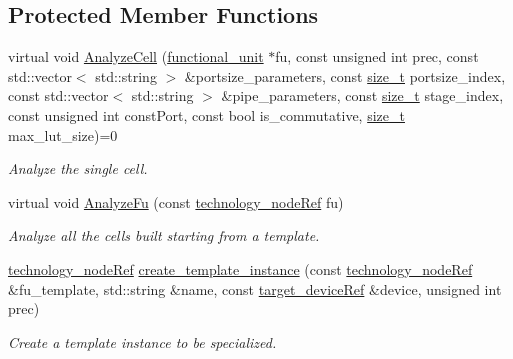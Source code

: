 \subsection*{Protected Member Functions}
\begin{DoxyCompactItemize}
\item 
virtual void \hyperlink{classFunctionalUnitStep_afe8188cf489c2c980bc537f5ed37a5cc}{Analyze\+Cell} (\hyperlink{structfunctional__unit}{functional\+\_\+unit} $\ast$fu, const unsigned int prec, const std\+::vector$<$ std\+::string $>$ \&portsize\+\_\+parameters, const \hyperlink{tutorial__fpt__2017_2intro_2sixth_2test_8c_a7c94ea6f8948649f8d181ae55911eeaf}{size\+\_\+t} portsize\+\_\+index, const std\+::vector$<$ std\+::string $>$ \&pipe\+\_\+parameters, const \hyperlink{tutorial__fpt__2017_2intro_2sixth_2test_8c_a7c94ea6f8948649f8d181ae55911eeaf}{size\+\_\+t} stage\+\_\+index, const unsigned int const\+Port, const bool is\+\_\+commutative, \hyperlink{tutorial__fpt__2017_2intro_2sixth_2test_8c_a7c94ea6f8948649f8d181ae55911eeaf}{size\+\_\+t} max\+\_\+lut\+\_\+size)=0
\begin{DoxyCompactList}\small\item\em Analyze the single cell. \end{DoxyCompactList}\item 
virtual void \hyperlink{classFunctionalUnitStep_a2456178e681c87f30485f3658589615f}{Analyze\+Fu} (const \hyperlink{technology__node_8hpp_a33dd193b7bd6b987bf0d8a770a819fa7}{technology\+\_\+node\+Ref} fu)
\begin{DoxyCompactList}\small\item\em Analyze all the cells built starting from a template. \end{DoxyCompactList}\item 
\hyperlink{technology__node_8hpp_a33dd193b7bd6b987bf0d8a770a819fa7}{technology\+\_\+node\+Ref} \hyperlink{classFunctionalUnitStep_a49ddb30d5388317d1ca7b69455aaeff0}{create\+\_\+template\+\_\+instance} (const \hyperlink{technology__node_8hpp_a33dd193b7bd6b987bf0d8a770a819fa7}{technology\+\_\+node\+Ref} \&fu\+\_\+template, std\+::string \&name, const \hyperlink{target__device_8hpp_acedb2b7a617e27e6354a8049fee44eda}{target\+\_\+device\+Ref} \&device, unsigned int prec)
\begin{DoxyCompactList}\small\item\em Create a template instance to be specialized. \end{DoxyCompactList}\end{DoxyCompactItemize}
